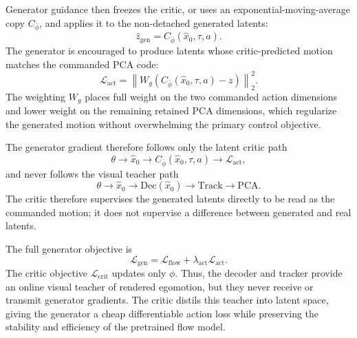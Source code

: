 \documentclass[letterpaper]{article} %
\begin{document}
Generator guidance then freezes the critic, or uses an exponential-moving-average copy \(C_{\bar{\phi}}\), and applies it to the non-detached generated latents:
\begin{equation}
    \hat{z}_{\mathrm{gen}}
    =
    C_{\bar{\phi}}(\hat{x}_0,\tau,a).
\end{equation}
The generator is encouraged to produce latents whose critic-predicted motion matches the commanded PCA code:
\begin{equation}
    \mathcal{L}_{\mathrm{act}}
    =
    \left\|
        W_g
        \left(
            C_{\bar{\phi}}(\hat{x}_0,\tau,a)
            -
            z
        \right)
    \right\|_2^2 .
    \label{eq:latent_action_loss}
\end{equation}
The weighting \(W_g\) places full weight on the two commanded action dimensions and lower weight on the remaining retained PCA dimensions, which regularize the generated motion without overwhelming the primary control objective.

The generator gradient therefore follows only the latent critic path
\begin{equation}
    \theta
    \rightarrow
    \hat{x}_0
    \rightarrow
    C_{\bar{\phi}}(\hat{x}_0,\tau,a)
    \rightarrow
    \mathcal{L}_{\mathrm{act}},
\end{equation}
and never follows the visual teacher path
\begin{equation}
    \theta
    \rightarrow
    \hat{x}_0
    \rightarrow
    \mathrm{Dec}(\hat{x}_0)
    \rightarrow
    \mathrm{Track}
    \rightarrow
    \mathrm{PCA}.
\end{equation}
The critic therefore supervises the generated latents directly to be read as the commanded motion; it does not supervise a difference between generated and real latents.

The full generator objective is
\begin{equation}
    \mathcal{L}_{\mathrm{gen}}
    =
    \mathcal{L}_{\mathrm{flow}}
    +
    \lambda_{\mathrm{act}}
    \mathcal{L}_{\mathrm{act}}.
    \label{eq:generator_objective}
\end{equation}
The critic objective \(\mathcal{L}_{\mathrm{crit}}\) updates only \(\phi\). Thus, the decoder and tracker provide an online visual teacher of rendered egomotion, but they never receive or transmit generator gradients. The critic distils this teacher into latent space, giving the generator a cheap differentiable action loss while preserving the stability and efficiency of the pretrained flow model.
\end{document}
